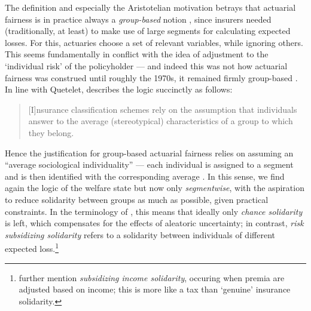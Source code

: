 \documentclass[11pt]{article} %
\begin{document}
The definition and especially the Aristotelian motivation betrays that actuarial fairness is in practice always a \textit{group-based} notion \citep{miller2009disparate}, since insurers needed (traditionally, at least) to make use of large segments for calculating expected losses. For this, actuaries choose a set of relevant variables, while ignoring others. This seems fundamentally in conflict with the idea of adjustment to the `individual risk' of the policyholder --- and indeed this was not how actuarial fairness was construed until roughly the 1970s, it remained firmly group-based \citep{barry2020insurance}.
In line with Quetelet, \citet{thiery2006fairness} describes the logic succinctly as follows:
\begin{quote}
    [I]nsurance classification schemes rely on the assumption that individuals answer to the average
(stereotypical) characteristics of a group to which they belong. 
\end{quote}

Hence the justification for group-based actuarial fairness relies on assuming an ``average sociological individuality'' \citep{dean1998risk} --- each individual is assigned to a segment and is then identified with the corresponding average \citep{krippner2022person}. In this sense, we find again the logic of the welfare state but now only \textit{segmentwise}, with the aspiration to reduce solidarity between groups as much as possible, given practical constraints.
In the terminology of \citet{lehtonen2011forms}, this means that ideally only \textit{chance solidarity} is left, which compensates for the effects of aleatoric uncertainty; in contrast, \textit{risk subsidizing solidarity} refers to a solidarity between individuals of different expected loss.\footnote{\citet{lehtonen2011forms} further mention \textit{subsidizing income solidarity}, occuring when premia are adjusted based on income; this is more like a tax than `genuine' insurance solidarity.}
\end{document}
